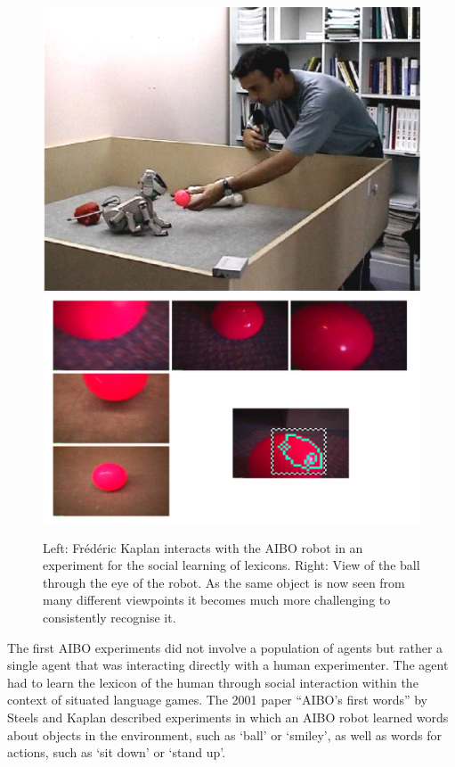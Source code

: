 \begin{figure}[htbp]
  \centerline{\includegraphics[width=.50\textwidth]{chap10/figs/look-ball.pdf}
\includegraphics[width=.45\textwidth]{chap10/figs/views-ball.pdf}}
\caption{\label{f:look-ball} 
Left: Fr\'{e}d\'{e}ric Kaplan interacts with the AIBO robot in an experiment for the social learning of lexicons.
Right: View of the ball through the eye of the robot. As the same object is now seen from many different viewpoints it 
becomes much more challenging to consistently recognise it.}
\end{figure}
The first AIBO experiments did not involve a population of agents but rather a single agent that was interacting directly with a human
experimenter. The agent had to learn the lexicon of the human through social 
interaction within the context of situated language games. The 2001
paper ``AIBO's first words'' by Steels and Kaplan described experiments in which an AIBO robot 
learned words about objects in the environment, such as `ball' or `smiley', as well as words for actions, such as 
`sit down' or `stand up'. 

